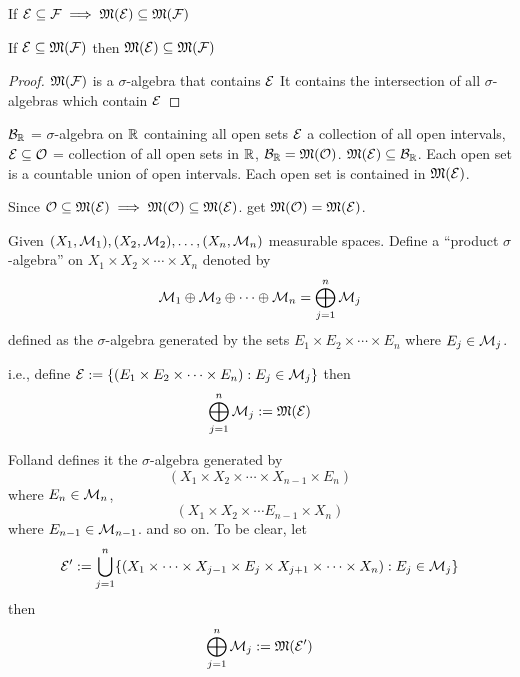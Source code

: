 \begin{remark}
If $\mathcal E\subseteq \mathcal F \implies \mathfrak M(\mathcal E) \subseteq \mathfrak M(\mathcal F)$
\end{remark}
\begin{lemma}
  If $\mathcal E \subseteq \mathfrak M(\mathcal F)$ then $\mathfrak M(\mathcal E) \subseteq \mathfrak M(\mathcal F)$
\end{lemma}
\begin{proof}
  $\mathfrak M(\mathcal F)$ is a $\sigma$-algebra that contains $\mathcal E$
  It contains the intersection of all $\sigma$-algebras which contain $\mathcal E$
\end{proof}

\begin{example}
  $\mathcal B_\mathbb R$ = $\sigma$-algebra on $\mathbb R$ containing all open sets 
  $\mathcal E$ a collection of all open intervals, 
  $\mathcal E\subseteq\mathcal O$ = collection of all open sets in $\mathbb R$,
  $\mathcal B_\mathbb R = \mathfrak M(\mathcal O)$. $\mathfrak M(\mathcal E) \subseteq \mathcal B_\mathbb R$.
  Each open set is a countable union of open intervals. Each open set is contained in $\mathfrak M(\mathcal E)$.
  
  Since $\mathcal O \subseteq \mathfrak M(\mathcal E) \implies \mathfrak M(\mathcal O) \subseteq \mathfrak M(\mathcal E)$.
  get $\mathfrak M(\mathcal O) = \mathfrak M(\mathcal E)$.
\end{example}


\begin{definition}
  Given $(X_1, \mathcal M_1), (X_2, \mathcal M_2), \dotsc, (X_n, \mathcal M_n)$ measurable spaces.
  Define a ``product $\sigma$-algebra'' on $X_1 \times X_2 \times \dotsm \times X_n$ denoted by
  \[\mathcal M_1 \oplus \mathcal M_2\oplus \dotsm \oplus \mathcal M_n = \bigoplus_{j=1}^n \mathcal M_j\]
  defined as the $\sigma$-algebra generated by the sets $E_1 \times E_2 \times \dotsm \times E_n$ where $E_j \in \mathcal M_j$.
  
  i.e., define $\mathcal E := \{(E_1 \times E_2 \times \dotsm \times E_n) : E_j \in \mathcal M_j\}$ then 
  \[ \bigoplus_{j=1}^n \mathcal M_j := \mathfrak M(\mathcal E)\]
\end{definition}

\begin{remark}
  Folland defines it the $\sigma$-algebra generated by 
  \[(X_1 \times X_2 \times \dotsm \times X_{n-1} \times E_n)\]
  where $E_n \in \mathcal M_n$, 
  \[(X_1 \times X_2 \times \dotsm E_{n-1} \times X_n)\]
  where $E_{n-1} \in \mathcal M_{n-1}$.
  and so on. To be clear, let 
  \[\mathcal E' := \bigcup_{j=1}^n \{ (X_1 \times \dotsm\times  X_{j-1} \times E_j \times X_{j+1} \times \dotsm \times X_n) : E_j \in \mathcal M_j\}\]
  then 
  \[\bigoplus_{j=1}^n \mathcal M_j := \mathfrak M(\mathcal E') \]
\end{remark}

